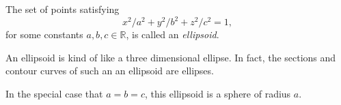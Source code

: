 \documentclass{ximera}
\begin{document}
\begin{example}
The set of points satisfying
\[
x^2/a^2 + y^2/b^2 + z^2/c^2 = 1,
\]
for some constants $a,b,c\in\mathbb{R}$, is called an \emph{ellipsoid}.

\begin{image}
\end{image}

An ellipsoid is kind of like a three dimensional ellipse. In fact, the sections and contour curves of such an an ellipsoid are ellipses.

In the special case that $a=b=c$, this ellipsoid is a sphere of radius $a$.
\end{example}
\end{document}
